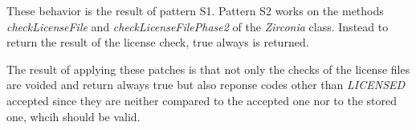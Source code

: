 These behavior is the result of pattern S1.
Pattern S2 works on the methods \textit{checkLicenseFile} and \textit{checkLicenseFilePhase2} of the \textit{Zirconia} class.
Instead to return the result of the license check, true always is returned.
\newline

The result of applying these patches is that not only the checks of the license files are voided and return always true but also reponse codes other than \textit{LICENSED} accepted since they are neither compared to the accepted one nor to the stored one, whcih should be valid.
